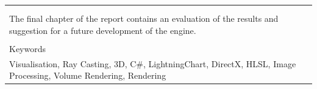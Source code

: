 \documentclass[english]{article}
\begin{document}
\begin{table}
\begin{tabular}{| p{2cm} | p{3cm} | p{4cm} | p{4cm} |}
{}\\
\multicolumn{4}{|l|}{ }\\
\multicolumn{4}{|p{13cm}|}{
The final chapter of the report contains an evaluation of the results and suggestion for a future development of the engine.
}\\
\multicolumn{4}{|l|}{ }\\
\hline
\multicolumn{4}{|l|}{Keywords}\\
\multicolumn{4}{|p{13cm}|}{Visualisation, Ray Casting, 3D, C\#, LightningChart, DirectX, HLSL, Image Processing, Volume Rendering, Rendering}\\
\hline
\end{tabular}
\end{table}


\tableofcontents


\newpage
\end{document}
